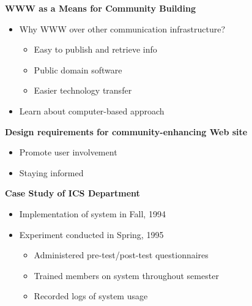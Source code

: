 \begin{slide}\Huge 
  {\bf WWW as a Means for Community Building}
  \horizontalline
  \begin{itemize}
  \item Why WWW over other communication infrastructure?

    \begin{itemize}
    \item Easy to publish and retrieve info

    \item Public domain software

    \item Easier technology transfer
    \end{itemize}

  \item Learn about computer-based approach
  \end{itemize}
\end{slide}\Huge 

\begin{slide}\Huge 
  {\bf Design requirements for community-enhancing Web site}
  \horizontalline
  \begin{itemize}
  \item Promote user involvement

  \item Staying informed
  \end{itemize}
\end{slide}\Huge 

\begin{slide}\Huge 
  {\bf Case Study of ICS Department}
  \horizontalline
  \begin{itemize}
  \item Implementation of system in Fall, 1994

  \item Experiment conducted in Spring, 1995

    \begin{itemize}
    \item Administered pre-test/post-test questionnaires

    \item Trained members on system throughout semester

    \item Recorded logs of system usage
    \end{itemize}
  \end{itemize}
\end{slide}\Huge 

